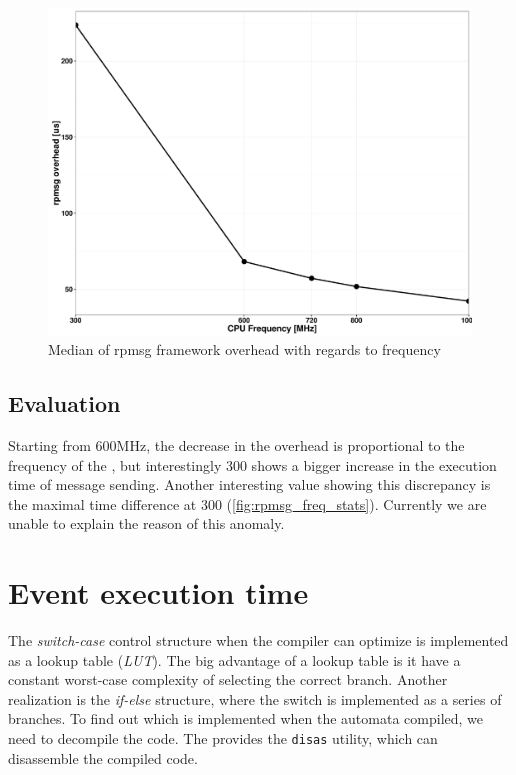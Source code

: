 \begin{figure}[h]
	\centering
	\includegraphics[width = \textwidth]{include/figures/rpmsg_freq}
	\caption{Median of rpmsg framework overhead with regards to \cpu{} frequency}
\label{fig:rpmsg_overhead_plot}
\end{figure}

\subsection{Evaluation}

Starting from 600MHz, the decrease in the overhead is proportional to the frequency of the \cpu{}, but interestingly \si{300}{\MHz} shows a bigger increase in the execution time of message sending. Another interesting value showing this discrepancy is the maximal time difference at \si{300}{\MHz} (\cref{fig:rpmsg_freq_stats}). Currently we are unable to explain the reason of this anomaly.

\section{Event execution time}

The \emph{switch-case} control structure when the compiler can optimize is implemented as a lookup table (\emph{LUT}). The big advantage of a lookup table is it have a constant worst-case complexity of selecting the correct branch. Another realization is the \emph{if-else} structure, where the switch is implemented as a series of branches. To find out which is implemented when the automata compiled, we need to decompile the code. The \pru{}  provides the \texttt{disas} utility, which can disassemble the compiled code.

